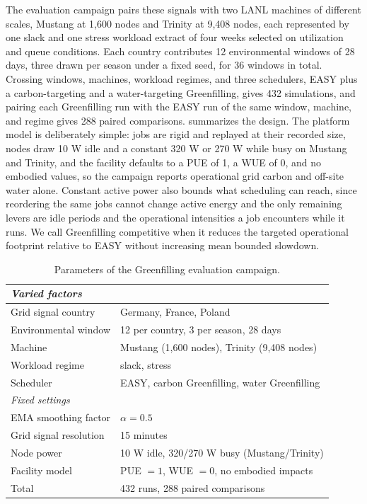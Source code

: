 The evaluation campaign pairs these signals with two LANL machines of different scales, Mustang at 1,600 nodes and Trinity at 9,408 nodes, each represented by one slack and one stress workload extract of four weeks selected on utilization and queue conditions. Each country contributes 12 environmental windows of 28 days, three drawn per season under a fixed seed, for 36 windows in total. Crossing windows, machines, workload regimes, and three schedulers, EASY plus a carbon-targeting and a water-targeting Greenfilling, gives 432 simulations, and pairing each Greenfilling run with the EASY run of the same window, machine, and regime gives 288 paired comparisons.  summarizes the design. The platform model is deliberately simple: jobs are rigid and replayed at their recorded size, nodes draw 10 W idle and a constant 320 W or 270 W while busy on Mustang and Trinity, and the facility defaults to a PUE of 1, a WUE of 0, and no embodied values, so the campaign reports operational grid carbon and off-site water alone. Constant active power also bounds what scheduling can reach, since reordering the same jobs cannot change active energy and the only remaining levers are idle periods and the operational intensities a job encounters while it runs. We call Greenfilling competitive when it reduces the targeted operational footprint relative to EASY without increasing mean bounded slowdown.

\begin{table}
\centering
\caption{Parameters of the Greenfilling evaluation campaign.}
\label{tab:greenfilling-campaign}
\begin{tabular}{ll}
\toprule
\multicolumn{2}{l}{\emph{Varied factors}} \\
\midrule
Grid signal country & Germany, France, Poland \\
Environmental window & 12 per country, 3 per season, 28 days \\
Machine & Mustang (1,600 nodes), Trinity (9,408 nodes) \\
Workload regime & slack, stress \\
Scheduler & EASY, carbon Greenfilling, water Greenfilling \\
\midrule
\multicolumn{2}{l}{\emph{Fixed settings}} \\
\midrule
EMA smoothing factor & $\alpha = 0.5$ \\
Grid signal resolution & 15 minutes \\
Node power & 10 W idle, 320/270 W busy (Mustang/Trinity) \\
Facility model & PUE $=1$, WUE $=0$, no embodied impacts \\
\midrule
Total & 432 runs, 288 paired comparisons \\
\bottomrule
\end{tabular}
\end{table}

